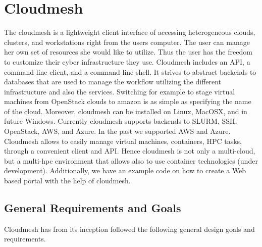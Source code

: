 \section{Cloudmesh}
\label{S:cmclient}

The cloudmesh is a lightweight client interface of accessing
heterogeneous clouds, clusters, and workstations right from the users
computer. The user can manage her own set of resources she would like
to utilize. Thus the user has the freedom to customize their cyber
infrastructure they use. Cloudmesh includes an API, a
command-line client, and a command-line shell. It strives to abstract
backends to databases that are used to manage the workflow utilizing
the different infrastructure and also the services. Switching for
example to stage virtual machines from OpenStack clouds to amazon is
as simple as specifying the name of the cloud. Moreover, cloudmesh can be installed on Linux, MacOSX, and in future
Windows. Currently cloudmesh supports backends to SLURM, SSH,
OpenStack, AWS, and Azure. In the past we supported AWS and Azure.
Cloudmesh allows to easily manage virtual machines, containers,
HPC tasks, through a convenient client and API. Hence cloudmesh is not
only a multi-cloud, but a multi-hpc environment that allows also to
use container technologies (under development). Additionally, we have
an example code on how to create a Web based portal with the help of
cloudmesh.

\subsection{General Requirements and Goals}

Cloudmesh has from its inception followed the following general design
goals and requirements.


